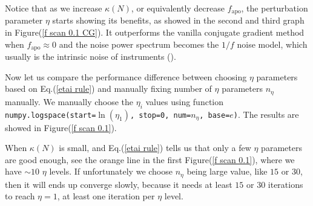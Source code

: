 \documentclass[twocolumn,linenumbers]{aastex631}
\begin{document}
Notice that as we increase $\kappa(N)$, or equivalently decrease
$f_{\text{apo}}$, the perturbation parameter $\eta$ starts showing its 
benefits, as showed in the second and third graph in Figure(\ref{f scan 0.1 CG}).
It outperforms the vanilla conjugate gradient method when 
$f_{\text{apo}} \approx 0$ and the noise power spectrum becomes the $1/f$ noise model,
which usually is the intrinsic noise of instruments (\cite{1997PhRvD..56.4514T}).
%


Now let us compare the performance difference between choosing $\eta$
parameters based on Eq.(\ref{etai rule})
and manually fixing number of $\eta$ parameters $n_{\eta}$ manually.
We manually choose the $\eta_i$ values using function
\texttt{numpy.logspace(start=$\ln(\eta_1)$, stop=0, num=$n_{\eta}$, base=$e$)}.
The results are showed in Figure(\ref{f scan 0.1}).

When $\kappa(N)$ is small, and Eq.(\ref{etai rule}) tells us that only a few
$\eta$ parameters are good enough, see the orange line in the first Figure(\ref{f scan 0.1}),
where we have $\sim 10$ $\eta$ levels.
If unfortunately we choose $n_{\eta}$ being large value, like $15$ or $30$,
then it will ends up converge slowly, because it needs at least $15$ or $30$
iterations to reach $\eta=1$, at least one iteration per $\eta$ level.
\end{document}
